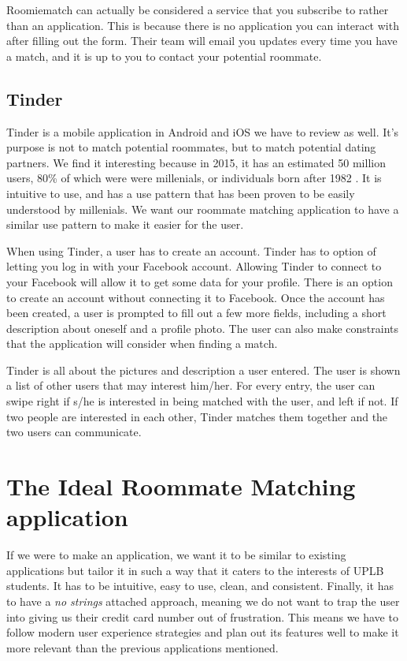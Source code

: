\documentclass[journal]{./IEEE/IEEEtran}
\begin{document}
Roomiematch can actually be considered a service that you subscribe to rather than an application. This is because there is no application you can interact with after filling out the form. Their team will email you updates every time you have a match, and it is up to you to contact your potential roommate.

\subsection{Tinder}
Tinder is a mobile application in Android and iOS we have to review as well. It's purpose is not to match potential roommates, but to match potential dating partners. We find it interesting because in 2015, it has an estimated 50 million users\cite{tinderstat2}, 80\% of which were were millenials, or individuals born after 1982 \cite{tinderstat}\cite{millenial}. It is intuitive to use, and has a use pattern that has been proven to be easily understood by millenials. We want our roommate matching application to have a similar use pattern to make it easier for the user.

When using Tinder, a user has to create an account. Tinder has to option of letting you log in with your Facebook account. Allowing Tinder to connect to your Facebook will allow it to get some data for your profile. There is an option to create an account without connecting it to Facebook. Once the account has been created, a user is prompted to fill out a few more fields, including a short description about oneself and a profile photo. The user can also make constraints that the application will consider when finding a match.

Tinder is all about the pictures and description a user entered. The user is shown a list of other users that may interest him/her. For every entry, the user can swipe right if s/he is interested in being matched with the user, and left if not. If two people are interested in each other, Tinder matches them together and the two users can communicate.

\section{The Ideal Roommate Matching application}
If we were to make an application, we want it to be similar to existing applications but tailor it in such a way that it caters to the interests of UPLB students. It has to be intuitive, easy to use, clean, and consistent. Finally, it has to have a \textit{no strings} attached approach, meaning we do not want to trap the user into giving us their credit card number out of frustration. This means we have to follow modern user experience strategies and plan out its features well to make it more relevant than the previous applications mentioned.
\end{document}
